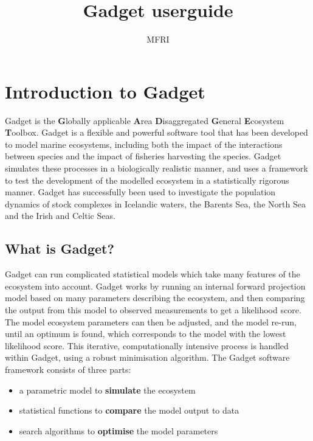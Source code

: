 \documentclass[]{book}
\title{Gadget userguide}
\author{MFRI}
\date{}
\begin{document}
\maketitle

{
\setcounter{tocdepth}{1}
\tableofcontents
}
\hypertarget{chap:intro}{%
\chapter{Introduction to Gadget}\label{chap:intro}}

Gadget is the \textbf{G}lobally applicable \textbf{A}rea \textbf{D}isaggregated
\textbf{G}eneral \textbf{E}cosystem \textbf{T}oolbox. Gadget is a flexible and powerful
software tool that has been developed to model marine ecosystems,
including both the impact of the interactions between species and the
impact of fisheries harvesting the species. Gadget simulates these
processes in a biologically realistic manner, and uses a framework to
test the development of the modelled ecosystem in a statistically
rigorous manner. Gadget has successfully been used to investigate the
population dynamics of stock complexes in Icelandic waters, the Barents
Sea, the North Sea and the Irish and Celtic Seas.

\hypertarget{sec:whatisgadget}{%
\section{What is Gadget?}\label{sec:whatisgadget}}

Gadget can run complicated statistical models which take many features
of the ecosystem into account. Gadget works by running an internal
forward projection model based on many parameters describing the
ecosystem, and then comparing the output from this model to observed
measurements to get a likelihood score. The model ecosystem parameters
can then be adjusted, and the model re-run, until an optimum is found,
which corresponds to the model with the lowest likelihood score. This
iterative, computationally intensive process is handled within Gadget,
using a robust minimisation algorithm. The Gadget software framework
consists of three parts:

\begin{itemize}
\item
  a parametric model to \textbf{simulate} the ecosystem
\item
  statistical functions to \textbf{compare} the model output to data
\item
  search algorithms to \textbf{optimise} the model parameters
\end{itemize}
\end{document}
